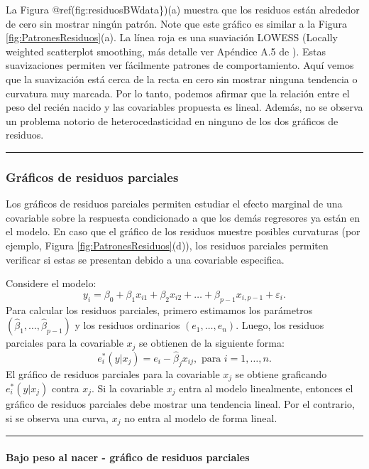 \documentclass[
]{article}
\begin{document}
La Figura @ref(fig:residuosBWdata\})(a) muestra que los residuos están alrededor de cero sin mostrar ningún patrón. Note que este gráfico es similar a la Figura \ref{fig:PatronesResiduos}(a). La línea roja es una suaviación LOWESS (Locally weighted scatterplot smoothing, más detalle ver Apéndice A.5 de \citet{weisberg_applied_2014}). Estas suavizaciones permiten ver fácilmente patrones de comportamiento. Aquí vemos que la suavización está cerca de la recta en cero sin mostrar ninguna tendencia o curvatura muy marcada. Por lo tanto, podemos afirmar que la relación entre el peso del recién nacido y las covariables propuesta es lineal. Además, no se observa un problema notorio de heterocedasticidad en ninguno de los dos gráficos de residuos.

\rule{\textwidth}{0.4pt}

\hypertarget{gruxe1ficos-de-residuos-parciales}{%
\subsubsection{Gráficos de residuos parciales}\label{gruxe1ficos-de-residuos-parciales}}

Los gráficos de residuos parciales permiten estudiar el efecto marginal de una covariable sobre la respuesta condicionado a que los demás regresores ya están en el modelo. En caso que el gráfico de los residuos muestre posibles curvaturas (por ejemplo, Figura \ref{fig:PatronesResiduos}(d)), los residuos parciales permiten verificar si estas se presentan debido a una covariable especifica.

Considere el modelo:
\[
y_{i} = \beta_{0} +\beta_{1}x_{i1}+\beta_{2}x_{i2} + \ldots + \beta_{p-1}x_{i,p-1} + \varepsilon_{i}.
\]
Para calcular los residuos parciales, primero estimamos los parámetros \((\widehat{\beta}_{1},\ldots,\widehat{\beta}_{p-1})\) y los residuos ordinarios \((e_{1},\ldots,e_{n})\). Luego, los residuos parciales para la covariable \(x_{j}\) se obtienen de la siguiente forma:
\[
e^{*}_{i}(y|x_{j}) = e_{i} - \widehat{\beta}_{j}x_{ij}, \mbox{ para } i=1,\ldots,n.
\]
El gráfico de residuos parciales para la covariable \(x_{j}\) se obtiene graficando \(e^{*}_{i}(y|x_{j})\) contra \(x_{j}\). Si la covariable \(x_{j}\) entra al modelo linealmente, entonces el gráfico de residuos parciales debe mostrar una tendencia lineal. Por el contrario, si se observa una curva, \(x_{j}\) no entra al modelo de forma lineal.

\rule{\textwidth}{0.4pt}

\hypertarget{bajo-peso-al-nacer---gruxe1fico-de-residuos-parciales}{%
\paragraph*{Bajo peso al nacer - gráfico de residuos parciales}\label{bajo-peso-al-nacer---gruxe1fico-de-residuos-parciales}}
\end{document}
